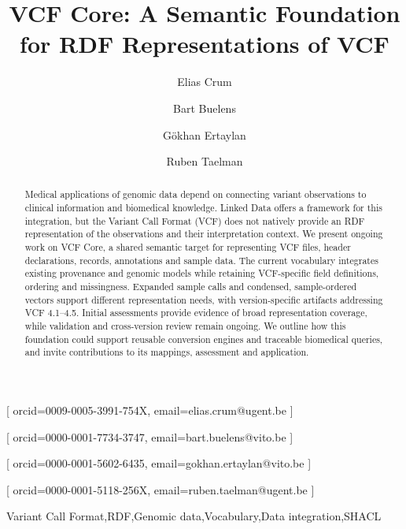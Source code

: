 \documentclass{ceurart}
\begin{document}

\title{VCF Core: A Semantic Foundation for RDF Representations of VCF}

\author[1,2]{Elias Crum}[
orcid=0009-0005-3991-754X,
email=elias.crum@ugent.be
]
\cormark[1]
\author[2]{Bart Buelens}[
orcid=0000-0001-7734-3747,
email=bart.buelens@vito.be
]
\author[2]{Gökhan Ertaylan}[
orcid=0000-0001-5602-6435,
email=gokhan.ertaylan@vito.be
]
\author[1]{Ruben Taelman}[
orcid=0000-0001-5118-256X,
email=ruben.taelman@ugent.be
]
\address[1]{IDLab, Department of Electronics and Information Systems, Ghent University -- imec, Belgium}
\address[2]{Flemish institute for Technological Research (VITO) Mol, Belgium}



\begin{abstract}
Medical applications of genomic data depend on connecting variant observations to clinical information and biomedical knowledge.
Linked Data offers a framework for this integration, but the Variant Call Format (VCF) does not natively provide an RDF representation of the observations and their interpretation context.
We present ongoing work on VCF Core, a shared semantic target for representing VCF files, header declarations, records, annotations and sample data.
The current vocabulary integrates existing provenance and genomic models while retaining VCF-specific field definitions, ordering and missingness.
Expanded sample calls and condensed, sample-ordered vectors support different representation needs, with version-specific artifacts addressing VCF 4.1--4.5.
Initial assessments provide evidence of broad representation coverage, while validation and cross-version review remain ongoing.
We outline how this foundation could support reusable conversion engines and traceable biomedical queries, and invite contributions to its mappings, assessment and application.
\end{abstract}
\begin{keywords}
Variant Call Format\sep RDF\sep Genomic data\sep Vocabulary\sep Data integration\sep SHACL
\end{keywords}
\maketitle
\end{document}
